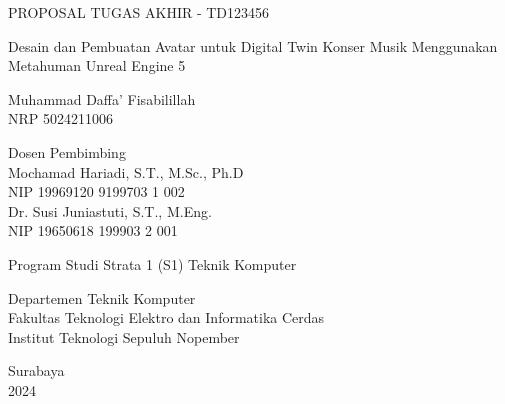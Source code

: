 \begin{large}
  PROPOSAL TUGAS AKHIR - TD123456
\end{large}

\vspace{\fill}

\begin{spacing}{1.5}
  \begin{Large}
    Desain dan  Pembuatan Avatar untuk Digital Twin Konser Musik Menggunakan Metahuman Unreal Engine 5 
  \end{Large}
\end{spacing}

\vspace{\fill}

\begin{large}
  Muhammad Daffa' Fisabilillah \\
  \textmd{NRP 5024211006}
\end{large}

\vspace{\fill}

\begin{large}
  \textmd{Dosen Pembimbing} \\
  Mochamad Hariadi, S.T., M.Sc., Ph.D \\
  \textmd{NIP 19969120 9199703 1 002} \\
  Dr. Susi Juniastuti, S.T., M.Eng. \\
  \textmd{NIP 19650618 199903 2 001}
\end{large}

\vspace{\fill}

Program Studi Strata 1 (S1) Teknik Komputer \\

\mdseries

Departemen Teknik Komputer \\
Fakultas Teknologi Elektro dan Informatika Cerdas \\
Institut Teknologi Sepuluh Nopember

Surabaya \\
2024
